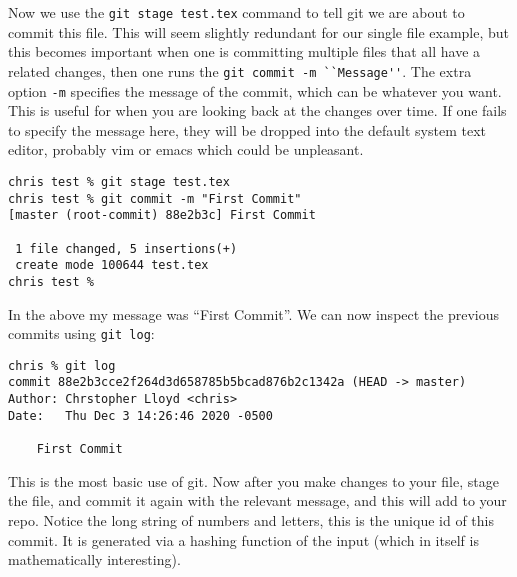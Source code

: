 \documentclass{article}
\begin{document}
Now we use the \lstinline{git stage test.tex} command to tell git we
are about to commit this file. This will seem slightly redundant for
our single file example, but this becomes important when one is
committing multiple files that all have a related changes, then one
runs the \lstinline{git commit -m ``Message''}. The extra option
\lstinline{-m} specifies the message of the commit, which can be
whatever you want. This is useful for when you are looking back at the
changes over time. If one fails to specify the message here, they will
be dropped into the default system text editor, probably vim or emacs
which could be unpleasant.
\begin{lstlisting}
chris test % git stage test.tex
chris test % git commit -m "First Commit"
[master (root-commit) 88e2b3c] First Commit

 1 file changed, 5 insertions(+)
 create mode 100644 test.tex
chris test % 
\end{lstlisting}
In the above my message was ``First Commit''. We can now inspect the
previous commits using \lstinline{git log}:


\begin{lstlisting}
chris % git log
commit 88e2b3cce2f264d3d658785b5bcad876b2c1342a (HEAD -> master)
Author: Chrstopher Lloyd <chris>
Date:   Thu Dec 3 14:26:46 2020 -0500

    First Commit

\end{lstlisting}
This is the most basic use of git. Now after you make changes to your
file, stage the file, and commit it again with the relevant
message, and this will add to your repo. Notice the long string of
numbers and letters, this is the unique id of this commit. It is
generated via a hashing function of the input (which in itself is
mathematically interesting).
\end{document}
